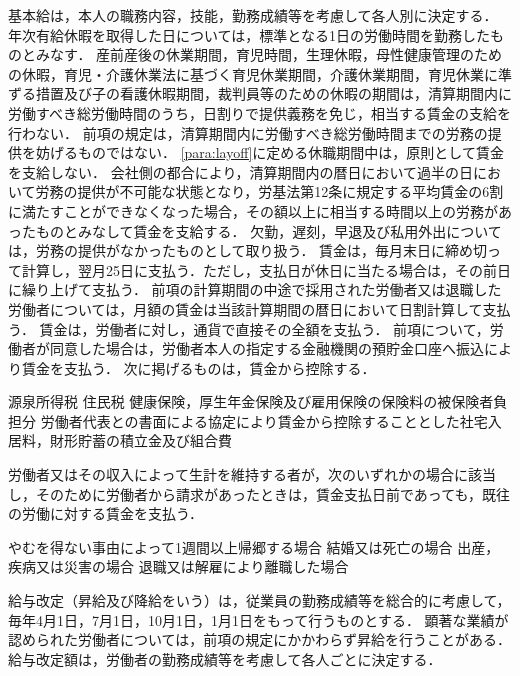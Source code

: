 \documentclass[11pt,a4paper]{jsarticle}
\begin{document}
基本給は，本人の職務内容，技能，勤務成績等を考慮して各人別に決定する．
年次有給休暇を取得した日については，標準となる1日の労働時間を勤務したものとみなす．
\term
産前産後の休業期間，育児時間，生理休暇，母性健康管理のための休暇，育児・介護休業法に基づく育児休業期間，介護休業期間，育児休業に準ずる措置及び子の看護休暇期間，裁判員等のための休暇の期間は，清算期間内に労働すべき総労働時間のうち，日割りで提供義務を免じ，相当する賃金の支給を行わない． 
\term
前項の規定は，清算期間内に労働すべき総労働時間までの労務の提供を妨げるものではない．
\term
\ref{para:layoff}に定める休職期間中は，原則として賃金を支給しない．
会社側の都合により，清算期間内の暦日において過半の日において労務の提供が不可能な状態となり，労基法第12条に規定する平均賃金の6割に満たすことができなくなった場合，その額以上に相当する時間以上の労務があったものとみなして賃金を支給する． 
欠勤，遅刻，早退及び私用外出については，労務の提供がなかったものとして取り扱う．
賃金は，毎月末日に締め切って計算し，翌月25日に支払う．ただし，支払日が休日に当たる場合は，その前日に繰り上げて支払う．
\term
前項の計算期間の中途で採用された労働者又は退職した労働者については，月額の賃金は当該計算期間の暦日において日割計算して支払う．
賃金は，労働者に対し，通貨で直接その全額を支払う．
\term
前項について，労働者が同意した場合は，労働者本人の指定する金融機関の預貯金口座へ振込により賃金を支払う．
\term
次に掲げるものは，賃金から控除する．
\begin{enumerate}
	\itm 源泉所得税
	\itm 住民税
	\itm 健康保険，厚生年金保険及び雇用保険の保険料の被保険者負担分
	\itm 労働者代表との書面による協定により賃金から控除することとした社宅入居料，財形貯蓄の積立金及び組合費
\end{enumerate}
労働者又はその収入によって生計を維持する者が，次のいずれかの場合に該当し，そのために労働者から請求があったときは，賃金支払日前であっても，既往の労働に対する賃金を支払う．
\begin{enumerate}
	\itm やむを得ない事由によって1週間以上帰郷する場合
	\itm 結婚又は死亡の場合
	\itm 出産，疾病又は災害の場合
	\itm 退職又は解雇により離職した場合
\end{enumerate}
給与改定（昇給及び降給をいう）は，従業員の勤務成績等を総合的に考慮して，毎年4月1日，7月1日，10月1日，1月1日をもって行うものとする．
\term
顕著な業績が認められた労働者については，前項の規定にかかわらず昇給を行うことがある．
\term
給与改定額は，労働者の勤務成績等を考慮して各人ごとに決定する．
\end{document}
